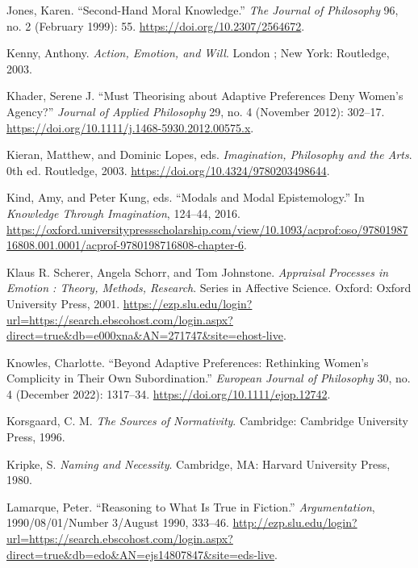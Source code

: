 \documentclass[phdthesis,12pt,final]{wuthesis}
\newlength{\cslhangindent}
\newenvironment{CSLReferences}[2] %
{\begin{list}{}{%
	\setlength{\itemindent}{0pt}
	\setlength{\leftmargin}{0pt}
	\setlength{\parsep}{0pt}
	\ifodd #1
	\setlength{\leftmargin}{\cslhangindent}
	\setlength{\itemindent}{-1\cslhangindent}
	\fi
	\setlength{\itemsep}{#2\baselineskip}}}
{\end{list}}
\theoremstyle{definition}
\theoremstyle{definition}
\theoremstyle{definition}
\theoremstyle{definition}
\theoremstyle{remark}
\begin{document}
\begin{CSLReferences}{1}{0}
Jones, Karen. {``Second-{Hand Moral Knowledge}.''} \emph{The Journal of Philosophy} 96, no. 2 (February 1999): 55. \url{https://doi.org/10.2307/2564672}.

Kenny, Anthony. \emph{Action, Emotion, and Will}. London ; New York: Routledge, 2003.

Khader, Serene J. {``Must {Theorising} about {Adaptive Preferences Deny Women}'s {Agency}?''} \emph{Journal of Applied Philosophy} 29, no. 4 (November 2012): 302--17. \url{https://doi.org/10.1111/j.1468-5930.2012.00575.x}.

Kieran, Matthew, and Dominic Lopes, eds. \emph{Imagination, {Philosophy} and the {Arts}}. 0th ed. Routledge, 2003. \url{https://doi.org/10.4324/9780203498644}.

Kind, Amy, and Peter Kung, eds. {``Modals and {Modal Epistemology}.''} In \emph{Knowledge {Through Imagination}}, 124--44, 2016. \url{https://oxford.universitypressscholarship.com/view/10.1093/acprof:oso/9780198716808.001.0001/acprof-9780198716808-chapter-6}.

Klaus R. Scherer, Angela Schorr, and Tom Johnstone. \emph{Appraisal {Processes} in {Emotion} : {Theory}, {Methods}, {Research}}. Series in {Affective Science}. Oxford: Oxford University Press, 2001. \url{https://ezp.slu.edu/login?url=https://search.ebscohost.com/login.aspx?direct=true&db=e000xna&AN=271747&site=ehost-live}.

Knowles, Charlotte. {``Beyond Adaptive Preferences: {Rethinking} Women's Complicity in Their Own Subordination.''} \emph{European Journal of Philosophy} 30, no. 4 (December 2022): 1317--34. \url{https://doi.org/10.1111/ejop.12742}.

Korsgaard, C. M. \emph{The Sources of Normativity}. Cambridge: Cambridge University Press, 1996.

Kripke, S. \emph{Naming and Necessity}. Cambridge, MA: Harvard University Press, 1980.

Lamarque, Peter. {``Reasoning to {What} Is {True} in {Fiction}.''} \emph{Argumentation}, 1990/08/01/Number 3/August 1990, 333--46. \url{http://ezp.slu.edu/login?url=https://search.ebscohost.com/login.aspx?direct=true&db=edo&AN=ejs14807847&site=eds-live}.


\end{CSLReferences}
\end{document}
